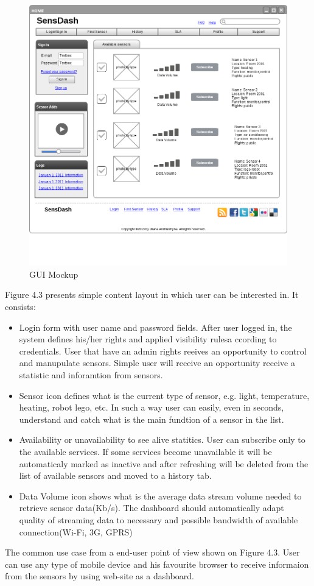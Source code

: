     \begin{figure}[!ht]
    \centering
    \includegraphics[scale=0.4]{images/Mockup.png}   
    \caption[GUI Mockup]{GUI Mockup}
    \label{img:GUI Mockup}                           
    \end{figure}
    Figure 4.3 presents simple content layout in which user can be interested in. It consists:
      \begin{itemize}
      \item Login form with user name and password fields. After user logged in, the system defines his/her rights and applied visibility rulesa ccording to credentials. User that have an admin rights reeives an opportunity to control and manupulate sensors. Simple user will receive an opportunity receive a statistic and inforamtion from sensors.
      \item Sensor icon defines what is the current type of sensor, e.g. light, temperature, heating, robot lego, etc. In such a way user can easily, even in seconds, understand and catch what is the main fundtion of a sensor in the list.
      \item Availability or unavailability to see alive statitics. User can subscribe only to the available services. If some services become unavailable it will be automaticaly marked as inactive and after refreshing will be deleted from the list of available sensors and moved to a history tab.
      \item Data Volume icon shows what is the average data stream volume needed to retrieve sensor data(Kb/s). The dashboard should automatically adapt quality of streaming data to necessary and possible bandwidth of available connection(Wi-Fi, 3G, GPRS)
      \end{itemize}
    The common use case from a end-user point of view shown on Figure 4.3. User can use any type of mobile device and his favourite browser to receive informaion from the sensors by using web-site as a dashboard.

